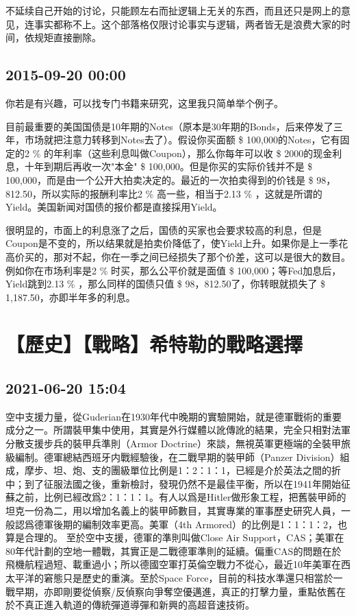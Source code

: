 \documentclass[twocolumn]{ctexart}
\begin{document}
不延续自己开始的讨论，只能顾左右而扯逻辑上无关的东西，而且还只是网上的意见，连事实都称不上。这个部落格仅限讨论事实与逻辑，两者皆无是浪费大家的时间，依规矩直接删除。\subsection*{2015-09-20 00:00}
你若是有兴趣，可以找专门书籍来研究，这里我只简单举个例子。

目前最重要的美国国债是10年期的Notes（原本是30年期的Bonds，后来停发了三年，市场就把注意力转移到Notes去了）。假设你买面额 \$ 100,000的Notes，它有固定的2 \% 的年利率（这些利息叫做Coupon），那么你每年可以收 \$ 2000的现金利息，十年到期后再收一次"本金" \$ 100,000。但是你买的实际价钱并不是 \$ 100,000，而是由一个公开大拍卖决定的。最近的一次拍卖得到的价钱是 \$ 98，812.50，所以实际的报酬利率比2 \% 高一些，相当于2.13 \% ，这就是所谓的Yield。美国新闻对国债的报价都是直接採用Yield。

很明显的，市面上的利息涨了之后，国债的买家也会要求较高的利息，但是Coupon是不变的，所以结果就是拍卖价降低了，使Yield上升。如果你是上一季花高价买的，那对不起，你在一季之间已经损失了那个价差，这可以是很大的数目。例如你在市场利率是2 \% 时买，那么公平价就是面值 \$ 100,000；等Fed加息后，Yield跳到2.13 \% ，那么同样的国债只值 \$ 98，812.50了，你转眼就损失了 \$ 1,187.50，亦即半年多的利息。\section*{【歷史】【戰略】希特勒的戰略選擇}
\subsection*{2021-06-20 15:04}

空中支援力量，從Guderian在1930年代中晚期的實驗開始，就是德軍戰術的重要成分之一。所謂裝甲集中使用，其實是外行媒體以訛傳訛的結果，完全只相對法軍分散支援步兵的裝甲兵準則（Armor Doctrine）來談，無視英軍更極端的全裝甲旅級編制。德軍總結西班牙内戰經驗後，在二戰早期的裝甲師（Panzer Division）組成，摩步、坦、炮、支的團級單位比例是1：2：1：1，已經是介於英法之間的折中；到了征服法國之後，重新檢討，發現仍然不是最佳平衡，所以在1941年開始征蘇之前，比例已經改爲2：1：1：1。有人以爲是Hitler做形象工程，把舊裝甲師的坦克一份為二，用以增加名義上的裝甲師數目，其實專業的軍事歷史研究人員，一般認爲德軍後期的編制效率更高。美軍（4th Armored）的比例是1：1：1：2，也算是合理的。
至於空中支援，德軍的準則叫做Close Air Support，CAS；美軍在80年代計劃的空地一體戰，其實正是二戰德軍準則的延續。偏重CAS的問題在於飛機航程過短、載重過小；所以德國空軍打英倫空戰力不從心，最近10年美軍在西太平洋的窘態只是歷史的重演。至於Space Force，目前的科技水準還只相當於一戰早期，亦即剛要從偵察/反偵察向爭奪空優邁進，真正的打擊力量，重點依舊在於不真正進入軌道的傳統彈道導彈和新興的高超音速技術。
\end{document}

